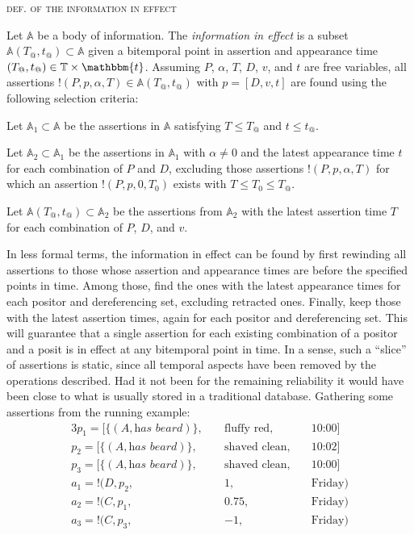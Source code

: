 \documentclass[sfsidenotes,nobib,twoside,symmetric]{tufte-handout}
\newcommand{\assert}{\text{!}}
\newcounter{majorcount}
\newcommand{\deffy}[3]{
	\vspace{2ex}
	\refstepcounter{majorcount} 
	\noindent\textsc{#1}%
	\\\begin{small}
	\noindent #2%
	\label{Def:#3}
	\end{small}
	\vspace{2ex}
}
\begin{document}
\deffy{def. of the information in effect}{%
Let $\mathbb{A}$ be a body of information. The \emph{information in effect} is a subset $\mathbb{A}(T_@, t_@) \subset \mathbb{A}$ given a bitemporal point in assertion and appearance time $(T_@, t_@) \in \mathbb{T} \times \mathbbm{t}$. Assuming $P$, $\alpha$, $T$, $D$, $v$, and $t$ are free variables, all assertions $\assert(P, p, \alpha, T) \in \mathbb{A}(T_@, t_@)$ with $p = [D, v, t]$ are found using the following selection criteria: 
\begin{criteria}
\item Let $\mathbb{A}_1 \subset \mathbb{A}$ be the assertions in $\mathbb{A}$ satisfying $T \leq T_@$ and $t \leq t_@$.
\item Let $\mathbb{A}_2 \subset \mathbb{A}_1$ be the assertions in $\mathbb{A}_1$ with $\alpha \neq 0$ and the latest appearance time $t$ for each combination of $P$ and $D$, excluding those assertions $\assert(P, p, \alpha, T)$ for which an assertion $\assert(P, p, 0, T_0)$ exists with $T \leq T_0 \leq T_@$.
\item Let $\mathbb{A}(T_@, t_@) \subset \mathbb{A}_2$ be the assertions from $\mathbb{A}_2$ with the latest assertion time $T$ for each combination of $P$, $D$, and $v$.
\end{criteria}
}{effect}

In less formal terms, the information in effect can be found by first rewinding all assertions to those whose assertion and appearance times are before the specified points in time. Among those, find the ones with the latest appearance times for each positor and dereferencing set, excluding retracted ones. Finally, keep those with the latest assertion times, again for each positor and dereferencing set. This will guarantee that a single assertion for each existing combination of a positor and a posit is in effect at any bitemporal point in time. In a sense, such a \enquote{slice} of assertions is static, since all temporal aspects have been removed by the operations described. Had it not been for the remaining reliability it would have been close to what is usually stored in a traditional database. Gathering some assertions from the running example:
\begin{alignat*}{3}
p_{1} = [\{(A, \textit{has beard})\},\;&& \textrm{fluffy red},\;&& \textrm{10:00}]  \\
p_{2} = [\{(A, \textit{has beard})\},\;&& \textrm{shaved clean},\;&& \textrm{10:02}]  \\
p_{3} = [\{(A, \textit{has beard})\},\;&& \textrm{shaved clean},\;&& \textrm{10:00}]  \\
a_1 = \assert(D, p_{2},\;&& 1,\;&& \textrm{Friday}) \\
a_2 = \assert(C, p_{1},\;&& 0.75,\;&& \textrm{Friday}) \\
a_3 = \assert(C, p_{3},\;&& -1,\;&& \textrm{Friday}) 
\end{alignat*}
\end{document}
